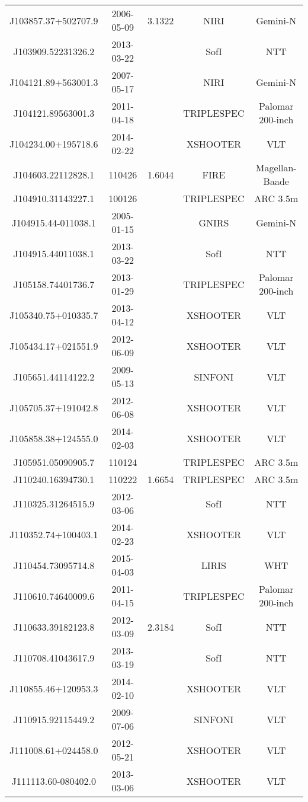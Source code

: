 {\begin{longtable}{ccccc}
J103857.37+502707.9 & 2006-05-09 & 3.1322 & NIRI & Gemini-N \\
J103909.52231326.2 & 2013-03-22 &  & SofI & NTT \\
J104121.89+563001.3 & 2007-05-17 &  & NIRI & Gemini-N \\
J104121.89563001.3 & 2011-04-18 &  & TRIPLESPEC & Palomar 200-inch \\
J104234.00+195718.6 & 2014-02-22 &  & XSHOOTER & VLT \\
J104603.22112828.1 & 110426 & 1.6044 & FIRE & Magellan-Baade \\
J104910.31143227.1 & 100126 &  & TRIPLESPEC & ARC 3.5m \\
J104915.44-011038.1 & 2005-01-15 &  & GNIRS & Gemini-N \\
J104915.44011038.1 & 2013-03-22 &  & SofI & NTT \\
J105158.74401736.7 & 2013-01-29 &  & TRIPLESPEC & Palomar 200-inch \\
J105340.75+010335.7 & 2013-04-12 &  & XSHOOTER & VLT \\
J105434.17+021551.9 & 2012-06-09 &  & XSHOOTER & VLT \\
J105651.44114122.2 & 2009-05-13 &  & SINFONI & VLT \\
J105705.37+191042.8 & 2012-06-08 &  & XSHOOTER & VLT \\
J105858.38+124555.0 & 2014-02-03 &  & XSHOOTER & VLT \\
J105951.05090905.7 & 110124 &  & TRIPLESPEC & ARC 3.5m \\
J110240.16394730.1 & 110222 & 1.6654 & TRIPLESPEC & ARC 3.5m \\
J110325.31264515.9 & 2012-03-06 &  & SofI & NTT \\
J110352.74+100403.1 & 2014-02-23 &  & XSHOOTER & VLT \\
J110454.73095714.8 & 2015-04-03 &  & LIRIS & WHT \\
J110610.74640009.6 & 2011-04-15 &  & TRIPLESPEC & Palomar 200-inch \\
J110633.39182123.8 & 2012-03-09 & 2.3184 & SofI & NTT \\
J110708.41043617.9 & 2013-03-19 &  & SofI & NTT \\
J110855.46+120953.3 & 2014-02-10 &  & XSHOOTER & VLT \\
J110915.92115449.2 & 2009-07-06 &  & SINFONI & VLT \\
J111008.61+024458.0 & 2012-05-21 &  & XSHOOTER & VLT \\
J111113.60-080402.0 & 2013-03-06 &  & XSHOOTER & VLT \\

\end{longtable}}
